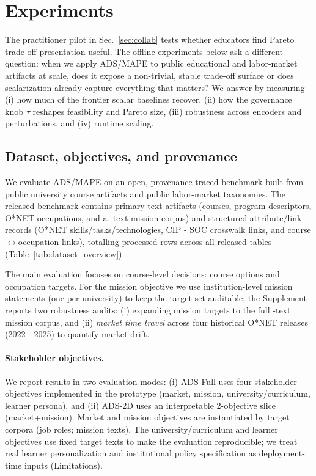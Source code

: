 \documentclass{article}
\newcommand{\ADS}{\textsc{ADS}\xspace}
\newcommand{\MAPE}{\textsc{MAPE}\xspace}
\begin{document}
\section{Experiments}

\label{sec:experiments}

The practitioner pilot in Sec.~\ref{sec:collab} tests whether educators find Pareto trade-off presentation useful. The offline experiments below ask a different question: when we apply \ADS/\MAPE to public educational and labor-market artifacts at scale, does it expose a non-trivial, stable trade-off surface or does scalarization already capture everything that matters? We answer by measuring (i) how much of the frontier scalar baselines recover, (ii) how the governance knob $\tau$ reshapes feasibility and Pareto size, (iii) robustness across encoders and perturbations, and (iv) runtime scaling.

\subsection{Dataset, objectives, and provenance}
\label{subsec:data}
We evaluate \ADS/\MAPE on an open, provenance-traced benchmark built from {public university course artifacts} and {public labor-market taxonomies}. The released benchmark contains {\NumPrimaryArtifacts} primary text artifacts (\NumCourses courses, \NumPrograms program descriptors, \NumOccupations O*NET occupations, and a \NumMissionsExpanded-text mission corpus) and {\NumAttributeRecords} structured attribute/link records (O*NET skills/tasks/technologies, CIP - SOC crosswalk links, and course$\leftrightarrow$occupation links), totalling {\NumProcessedRows} processed rows across all released tables (Table~\ref{tab:dataset_overview}).

The {main evaluation} focuses on course-level decisions: \NumCourses course options and \NumOccupations occupation targets. For the mission objective we use {\NumMissionsMain} institution-level mission statements (one per university) to keep the target set auditable; the Supplement reports two robustness audits: (i) expanding mission targets to the full \NumMissionsExpanded-text mission corpus, and (ii) \emph{market time travel} across four historical O*NET releases (2022 - 2025) to quantify market drift.

\paragraph{Stakeholder objectives.}
We report results in two evaluation modes:
(i) {ADS-Full} uses four stakeholder objectives implemented in the prototype (market, mission, university/curriculum, learner persona), and
(ii) {ADS-2D} uses an interpretable 2-objective slice (market+mission).
Market and mission objectives are instantiated by target corpora (job roles; mission texts). The university/curriculum and learner objectives use fixed target texts to make the evaluation reproducible; we treat real learner personalization and institutional policy specification as deployment-time inputs (Limitations).
\end{document}
